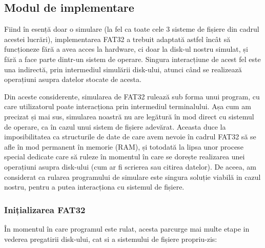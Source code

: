 \bigskip


\subsection{Modul de implementare}

Fiind în esență doar o simulare (la fel ca toate cele 3 sisteme de fișiere din cadrul acestei lucrări), implementarea FAT32 a trebuit adaptată astfel încât să funcționeze fără a avea acces la hardware, ci doar la disk-ul nostru simulat, și fără a face parte dintr-un sistem de operare. Singura interacțiune de acest fel este una indirectă, prin intermediul simulării disk-ului, atunci când se realizează operațiuni asupra datelor stocate de acesta.

Din aceste considerente, simularea de FAT32 rulează sub forma unui program, cu care utilizatorul poate interacționa prin intermediul terminalului. Așa cum am precizat și mai sus, simularea noastră nu are legătură în mod direct cu sistemul de operare, ca în cazul unui sistem de fișiere adevărat. Aceasta duce la imposibilitatea ca structurile de date de care avem nevoie în cadrul FAT32 să se afle în mod permanent în memorie (RAM), și totodată la lipsa unor procese special dedicate care să ruleze în momentul în care se dorește realizarea unei operațiuni asupra disk-ului (cum ar fi scrierea sau citirea datelor). De aceea, am considerat ca rularea programului de simulare este singura soluție viabilă in cazul nostru, pentru a putea interacționa cu sistemul de fișiere.


\subsubsection{Inițializarea FAT32}

În momentul în care programul este rulat, acesta parcurge mai multe etape in vederea pregatirii disk-ului, cat si a sistemului de fișiere propriu-zis:

